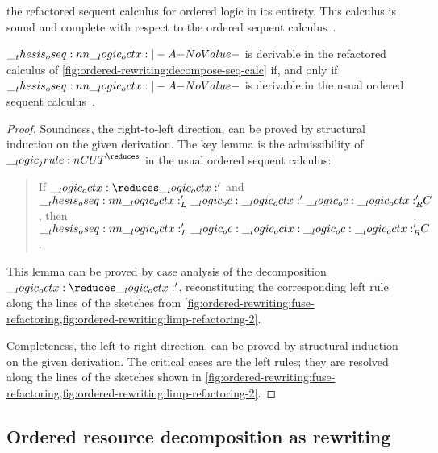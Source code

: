  the refactored sequent calculus for ordered logic in its entirety.
This calculus is sound and complete with respect to the ordered sequent calculus~.
%
\begin{theorem}
  $\oseq{\octx |- A}$ is derivable in the refactored calculus of \cref{fig:ordered-rewriting:decompose-seq-calc} if, and only if $\oseq{\octx |- A}$ is derivable in the usual ordered sequent calculus~.
\end{theorem}
%
\begin{proof}
  Soundness, the right-to-left direction, can be proved by structural induction on the given derivation.
  The key lemma is the admissibility of $\jrule{CUT}^{\reduces}$ in the usual ordered sequent calculus:
  \begin{quotation}
    \normalsize If $\octx \reduces \octx'$ and $\oseq{\octx'_L \oc \octx' \oc \octx'_R |- C}$, then $\oseq{\octx'_L \oc \octx \oc \octx'_R |- C}$.
  \end{quotation}
  This lemma can be proved by case analysis of the decomposition $\octx \reduces \octx'$, reconstituting the corresponding left rule along the lines of the sketches from \cref{fig:ordered-rewriting:fuse-refactoring,fig:ordered-rewriting:limp-refactoring-2}.

%
%
  Completeness, the left-to-right direction, can be proved by structural induction on the given derivation.
  The critical cases are the left rules; they are resolved along the lines of the sketches shown in \cref{fig:ordered-rewriting:fuse-refactoring,fig:ordered-rewriting:limp-refactoring-2}.
\end{proof}

\subsection{Ordered resource decomposition as rewriting}

